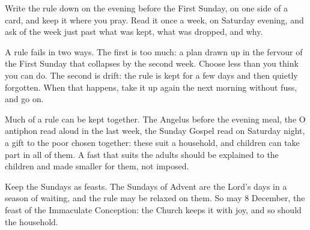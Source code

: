 Write the rule down on the evening before the First Sunday, on one side of a
card, and keep it where you pray. Read it once a week, on Saturday evening, and
ask of the week just past what was kept, what was dropped, and why.

A rule fails in two ways. The first is too much: a plan drawn up in the fervour
of the First Sunday that collapses by the second week. Choose less than you
think you can do. The second is drift: the rule is kept for a few days and then
quietly forgotten. When that happens, take it up again the next morning without
fuss, and go on.

Much of a rule can be kept together. The Angelus before the evening meal, the
O antiphon read aloud in the last week, the Sunday Gospel read on Saturday
night, a gift to the poor chosen together: these suit a household, and children
can take part in all of them. A fast that suits the adults should be explained
to the children and made smaller for them, not imposed.

Keep the Sundays as feasts. The Sundays of Advent are the Lord's days in a
season of waiting, and the rule may be relaxed on them. So may 8 December, the
feast of the Immaculate Conception: the Church keeps it with joy, and so should
the household.
